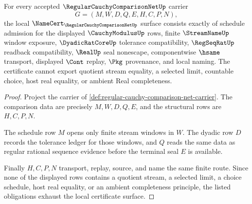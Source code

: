 \begin{theorem}
\label{thm:regular-cauchy-comparison-net-namecert-obligations}
For every accepted $\RegularCauchyComparisonNetUp$ carrier
$$
G=(M,W,D,Q,E,H,C,P,N),
$$
the local $\NameCert_{\RegularCauchyComparisonNetUp}$ surface consists exactly of schedule admission for the displayed $\CauchyModulusUp$ rows, finite $\StreamNameUp$ window exposure, $\DyadicRatCoreUp$ tolerance compatibility, $\RegSeqRatUp$ readback compatibility, $\RealUp$ seal nonescape, componentwise $\hsame$ transport, displayed $\Cont$ replay, $\Pkg$ provenance, and local naming. The certificate cannot export quotient stream equality, a selected limit, countable choice, host real equality, or ambient Real completeness.
\end{theorem}
\begin{proof}
Project the carrier of \autoref{def:regular-cauchy-comparison-net-carrier}. The comparison data are precisely $M,W,D,Q,E$, and the structural rows are $H,C,P,N$.

The schedule row $M$ opens only finite stream windows in $W$. The dyadic row $D$ records the tolerance ledger for those windows, and $Q$ reads the same data as regular rational sequence evidence before the terminal seal $E$ is available.

Finally $H,C,P,N$ transport, replay, source, and name the same finite route. Since none of the displayed rows contains a quotient stream, a selected limit, a choice schedule, host real equality, or an ambient completeness principle, the listed obligations exhaust the local certificate surface.
\end{proof}

